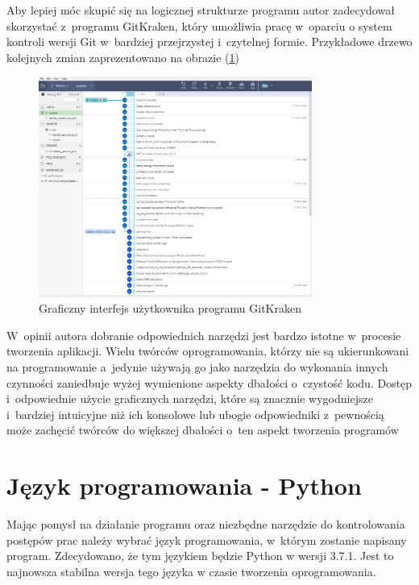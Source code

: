\documentclass[eng,printmode]{mgr}
\begin{document}
Aby lepiej móc skupić się na logicznej strukturze programu autor zadecydował skorzystać z~programu GitKraken, który umożliwia pracę w~oparciu o system kontroli wersji Git w~bardziej przejrzystej i~czytelnej formie. Przykładowe drzewo kolejnych zmian zaprezentowano na obrazie (\ref{GitKraken})

\begin{figure}[hbtp]
\label{GitKraken}
\caption{Graficzny interfejs użytkownika programu GitKraken}
\centering
\includegraphics[width=0.8\textwidth]{GitKraken.PNG}
\end{figure}

W~opinii autora dobranie odpowiednich narzędzi jest bardzo istotne w~procesie tworzenia aplikacji. Wielu twórców oprogramowania, którzy nie są ukierunkowani na programowanie a~jedynie używają go jako narzędzia do wykonania innych czynności zaniedbuje wyżej wymienione aspekty dbałości o~czystość kodu. Dostęp i~odpowiednie użycie graficznych narzędzi, które są znacznie wygodniejsze i~bardziej intuicyjne niż ich konsolowe lub ubogie odpowiedniki z~pewnością może zachęcić twórców do większej dbałości o~ten aspekt tworzenia programów

\section{Język programowania - Python}\label{wybrany_jezyk}
Mając pomysł na działanie programu oraz niezbędne narzędzie do kontrolowania postępów prac należy wybrać język programowania, w~którym zostanie napisany program. Zdecydowano, że tym językiem będzie Python w wersji 3.7.1. Jest to najnowsza stabilna wersja tego języka \cite{Python_latest_release} w czasie tworzenia oprogramowania.
\end{document}
